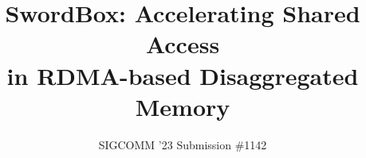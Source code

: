 \documentclass[sigconf,10pt]{acmart}
\newcommand{\sword}{SwordBox}
\begin{document}

\title[\sword]{\sword: Accelerating Shared Access\\in RDMA-based Disaggregated Memory}

\author{SIGCOMM '23 Submission \#1142}




\maketitle




% 
% 
% 




% 


\balance
\vspace{-0.3cm}
{\footnotesize 
}

\appendix

\end{document}
